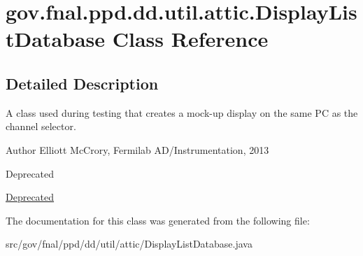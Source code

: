 \hypertarget{classgov_1_1fnal_1_1ppd_1_1dd_1_1util_1_1attic_1_1DisplayListDatabase}{\section{gov.\-fnal.\-ppd.\-dd.\-util.\-attic.\-Display\-List\-Database Class Reference}
\label{classgov_1_1fnal_1_1ppd_1_1dd_1_1util_1_1attic_1_1DisplayListDatabase}
}


\subsection{Detailed Description}
A class used during testing that creates a mock-\/up display on the same P\-C as the channel selector.

\begin{DoxyAuthor}{Author}
Elliott Mc\-Crory, Fermilab A\-D/\-Instrumentation, 2013 
\end{DoxyAuthor}
\begin{DoxyRefDesc}{Deprecated}
\item[\hyperlink{deprecated__deprecated000009}{Deprecated}]\end{DoxyRefDesc}


The documentation for this class was generated from the following file\-:\begin{DoxyCompactItemize}
\item 
src/gov/fnal/ppd/dd/util/attic/Display\-List\-Database.\-java\end{DoxyCompactItemize}

